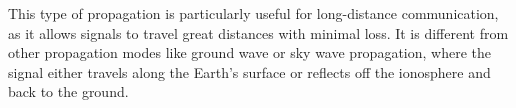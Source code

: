 This type of propagation is particularly useful for long-distance communication, as it allows signals to travel great distances with minimal loss. It is different from other propagation modes like ground wave or sky wave propagation, where the signal either travels along the Earth's surface or reflects off the ionosphere and back to the ground.

